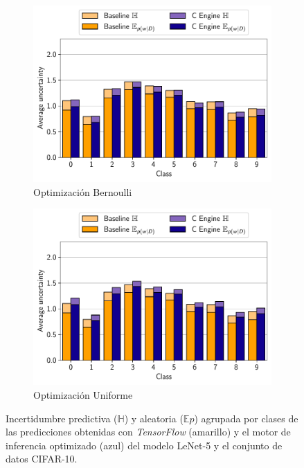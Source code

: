 \begin{figure}[h]
    \begin{subfigure}[b]{0.49\textwidth}
         \centering
         \includegraphics[width=\textwidth]{root/Imagenes/opt_software/Bernoulli/LENET_CIFAR/class_uncertainty.pdf}
         \caption{Optimización Bernoulli}
    \end{subfigure}
    \hfill
    \begin{subfigure}[b]{0.49\textwidth}
         \centering
         \includegraphics[width=\textwidth]{root/Imagenes/opt_software/Uniform/LENET_CIFAR/class_uncertainty.pdf}
         \caption{Optimización Uniforme}
    \end{subfigure}
    \caption{Incertidumbre predictiva ($\mathbb{H}$) y aleatoria ($\mathbb{E}p$) agrupada por clases de las predicciones obtenidas con \textit{TensorFlow} (amarillo) y el motor de inferencia optimizado (azul) del modelo LeNet-5 y el conjunto de datos CIFAR-10.}
    \label{fig:comp_lenet_cifar}
\end{figure}

